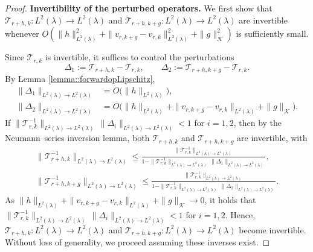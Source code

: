 \documentclass[11pt]{article}
\theoremstyle{plain}
\begin{document}
\begin{proof}
\noindent \textbf{Invertibility of the perturbed operators.}
We first show that $\mathcal{T}_{r+h,k}:L^2(\lambda)\to L^2(\lambda)$ and 
$\mathcal{T}_{r+h,k+g}:L^2(\lambda)\to L^2(\lambda)$ are invertible whenever 
$O\!\left(\|h\|_{L^2(\lambda)}^{2}+\|v_{r,k+g}-v_{r,k}\|_{L^2(\lambda)}^{2}+\|g\|_{\mathcal K}^{2}\right)$ 
is sufficiently small.  

Since $\mathcal{T}_{r,k}$ is invertible, it suffices to control the perturbations
\[
\Delta_1:=\mathcal{T}_{r+h,k}-\mathcal{T}_{r,k}, 
\qquad 
\Delta_2:=\mathcal{T}_{r+h,k+g}-\mathcal{T}_{r,k}.
\]
By Lemma \ref{lemma::forwardopLipschitz},
\begin{align*}
\|\Delta_1\|_{L^2(\lambda)\to L^2(\lambda)} &= O\!\big(\|h\|_{L^2(\lambda)}\big),\\
\|\Delta_2\|_{L^2(\lambda)\to L^2(\lambda)} &= O\!\Big(\|h\|_{L^2(\lambda)}+\|v_{r,k+g}-v_{r,k}\|_{L^2(\lambda)}+\|g\|_{\mathcal K}\Big).
\end{align*}
If $\|\mathcal{T}_{r,k}^{-1}\|_{L^2(\lambda)\to L^2(\lambda)}\,\|\Delta_i\|_{L^2(\lambda)\to L^2(\lambda)}<1$ for $i=1,2$,
then by the Neumann–series inversion lemma, both $\mathcal{T}_{r+h,k}$ and 
$\mathcal{T}_{r+h,k+g}$ are invertible, with
\begin{align*}
    \|\mathcal{T}_{r+h,k}^{-1}\|_{L^2(\lambda)\to L^2(\lambda)}
\le \frac{\|\mathcal{T}_{r,k}^{-1}\|_{L^2(\lambda)\to L^2(\lambda)}}{1-\|\mathcal{T}_{r,k}^{-1}\|_{L^2(\lambda)\to L^2(\lambda)}\,\|\Delta_1\|_{L^2(\lambda)\to L^2(\lambda)}},\\
\|\mathcal{T}_{r+h,k+g}^{-1}\|_{L^2(\lambda)\to L^2(\lambda)}
\le \frac{\|\mathcal{T}_{r,k}^{-1}\|_{L^2(\lambda)\to L^2(\lambda)}}{1-\|\mathcal{T}_{r,k}^{-1}\|_{L^2(\lambda)\to L^2(\lambda)}\,\|\Delta_2\|_{L^2(\lambda)\to L^2(\lambda)}}.
\end{align*}
As $\|h\|_{L^2(\lambda)}+\|v_{r,k+g}-v_{r,k}\|_{L^2(\lambda)}+\|g\|_{\mathcal K} \rightarrow 0$, it holds that $\|\mathcal{T}_{r,k}^{-1}\|_{L^2(\lambda)\to L^2(\lambda)}\,\|\Delta_i\|_{L^2(\lambda)\to L^2(\lambda)}<1$ for $i=1,2$. 
Hence,  $\mathcal{T}_{r+h,k}:L^2(\lambda)\to L^2(\lambda)$ and 
$\mathcal{T}_{r+h,k+g}:L^2(\lambda)\to L^2(\lambda)$ become invertible.
Without loss of generality, we proceed assuming these inverses exist.
 
 


\end{proof}
\end{document}
